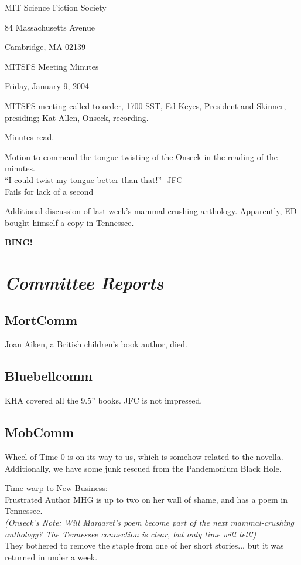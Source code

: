 \documentclass[10pt]{article}
\newcommand{\bing}{{\bf BING!} }
\newcommand{\goto}[1]{\bing \vskip 12pt \section*{{\em{#1}}}}
\begin{document}
\begin{center}

MIT Science Fiction Society 

84 Massachusetts Avenue

Cambridge, MA 02139

\vspace{12pt}

MITSFS Meeting Minutes 

Friday, January 9, 2004

\end{center}
 
\vspace{18pt}

\setlength{\parskip}{6pt}

\noindent
MITSFS meeting called to order, 1700 SST, Ed Keyes, President and
Skinner, presiding; Kat Allen,  Onseck, recording.

Minutes read.

Motion to commend the tongue twisting of the Onseck in the reading of
the minutes.\\
``I could twist my tongue better than that!'' -JFC\\
Fails for lack of a second

Additional discussion of last week's mammal-crushing anthology.
Apparently, ED bought himself a copy in Tennessee.

\goto{Committee Reports}
\subsection*{MortComm}
Joan Aiken, a British children's book author, died.

\subsection*{Bluebellcomm}
KHA covered all the 9.5'' books. JFC is not impressed.

\subsection*{MobComm}
Wheel of Time 0 is on its way to us, which is somehow related to the
novella. Additionally, we have some junk rescued from the Pandemonium
Black Hole.

Time-warp to New Business: \\
Frustrated Author MHG is up to two on her wall of shame, and has a
poem in Tennessee. \\
\emph{(Onseck's Note: Will Margaret's poem become part of
the next mammal-crushing anthology? The Tennessee connection is clear,
but only time will tell!)}\\
They bothered to remove the staple from one of her
short stories... but it was returned in under a week.
\end{document}

